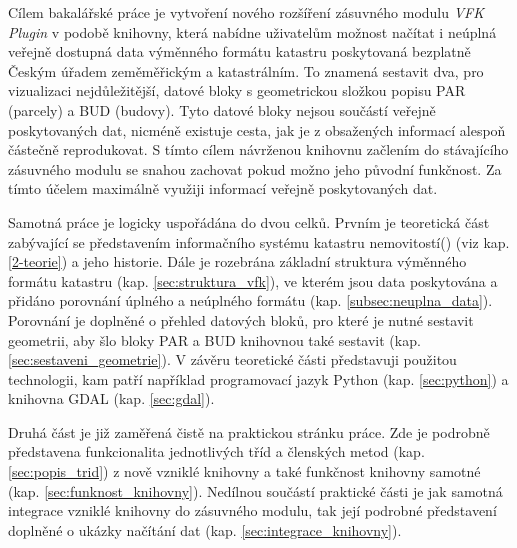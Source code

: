 Cílem bakalářské práce je vytvoření nového rozšíření zásuvného modulu
\textit{VFK Plugin} v podobě knihovny, která nabídne uživatelům
možnost načítat i neúplná veřejně dostupná data výměnného formátu
katastru poskytovaná bezplatně Českým úřadem zeměměřickým a
katastrálním.  To znamená sestavit dva, pro vizualizaci
nejdůležitější, datové bloky s geometrickou složkou popisu PAR
(parcely) a BUD (budovy). Tyto datové bloky nejsou součástí veřejně poskytovaných
dat, nicméně existuje cesta, jak je z obsažených informací alespoň částečně
reprodukovat. S tímto cílem návrženou knihovnu začlením do stávajícího zásuvného modulu
se snahou zachovat pokud možno jeho původní funkčnost. Za tímto účelem
maximálně využiji informací veřejně poskytovaných dat.

Samotná práce je logicky uspořádána do dvou celků. Prvním je
teoretická část zabývající se představením informačního systému
katastru nemovitostí() (viz kap. \ref{2-teorie}) a jeho
historie. Dále je rozebrána základní struktura výměnného formátu
katastru (kap. \ref{sec:struktura_vfk}), ve kterém jsou data
poskytována a přidáno porovnání úplného a neúplného formátu
(kap. \ref{subsec:neuplna_data}).  Porovnání je doplněné o přehled
datových bloků, pro které je nutné sestavit geometrii, aby šlo bloky
PAR a BUD knihovnou také sestavit
(kap. \ref{sec:sestaveni_geometrie}). V závěru teoretické části
představuji použitou technologii, kam patří například programovací
jazyk Python (kap. \ref{sec:python}) a knihovna GDAL
(kap. \ref{sec:gdal}).

Druhá část je již zaměřená čistě na praktickou stránku práce. Zde je
podrobně představena funkcionalita jednotlivých tříd a členských metod
(kap. \ref{sec:popis_trid}) z nově vzniklé knihovny a také funkčnost
knihovny samotné (kap. \ref{sec:funknost_knihovny}). Nedílnou součástí
praktické části je jak samotná integrace vzniklé knihovny do zásuvného
modulu, tak její podrobné představení doplněné o ukázky načítání dat
(kap. \ref{sec:integrace_knihovny}).
